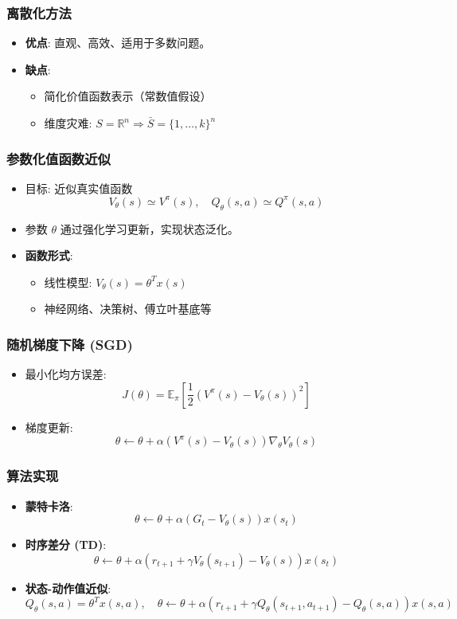 \subsubsection{离散化方法}
\begin{itemize}
    \item \textbf{优点}: 直观、高效、适用于多数问题。
    \item \textbf{缺点}: 
    \begin{itemize}
        \item 简化价值函数表示（常数值假设）
        \item 维度灾难: $S = \mathbb{R}^n \Rightarrow \bar{S} = \{1, \dots, k\}^n$
    \end{itemize}
\end{itemize}

\subsubsection{参数化值函数近似}
\begin{itemize}
    \item 目标: 近似真实值函数
    \[
        V_\theta(s) \simeq V^\pi(s), \quad Q_\theta(s,a) \simeq Q^\pi(s,a)
    \]
    \item 参数 $\theta$ 通过强化学习更新，实现状态泛化。
    \item \textbf{函数形式}:
    \begin{itemize}
        \item 线性模型: $V_\theta(s) = \theta^T x(s)$
        \item 神经网络、决策树、傅立叶基底等
    \end{itemize}
\end{itemize}

\subsubsection{随机梯度下降 (SGD)}
\begin{itemize}
    \item 最小化均方误差:
    \[
        J(\theta) = \mathbb{E}_\pi \left[ \frac{1}{2} (V^\pi(s) - V_\theta(s))^2 \right]
    \]
    \item 梯度更新:
    \[
        \theta \leftarrow \theta + \alpha (V^\pi(s) - V_\theta(s)) \nabla_\theta V_\theta(s)
    \]
\end{itemize}

\subsubsection{算法实现}
\begin{itemize}
    \item \textbf{蒙特卡洛}:
    \[
        \theta \leftarrow \theta + \alpha (G_t - V_\theta(s)) x(s_t)
    \]
    \item \textbf{时序差分 (TD)}:
    \[
        \theta \leftarrow \theta + \alpha (r_{t+1} + \gamma V_\theta(s_{t+1}) - V_\theta(s)) x(s_t)
    \]
    \item \textbf{状态-动作值近似}:
    \[
        Q_\theta(s,a) = \theta^T x(s,a), \quad \theta \leftarrow \theta + \alpha (r_{t+1} + \gamma Q_\theta(s_{t+1},a_{t+1}) - Q_\theta(s,a)) x(s,a)
    \]
\end{itemize}

